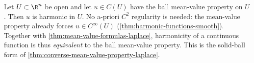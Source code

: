 \begin{theorem}
\label{thm:converse-mean-value-property-mvp}
\leanok
Let $U \subset \R^n$ be open and let $u \in C(U)$ have the ball mean-value property
on $U$. Then $u$ is harmonic in $U$. No a-priori $C^2$ regularity is needed: the
mean-value property already forces $u \in C^\infty(U)$
(\cref{thm:harmonic-functions-smooth}). Together with
\cref{thm:mean-value-formulas-laplace}, harmonicity of a continuous function is thus
\emph{equivalent} to the ball mean-value property. This is the solid-ball form of
\cref{thm:converse-mean-value-property-laplace}.
\end{theorem}

